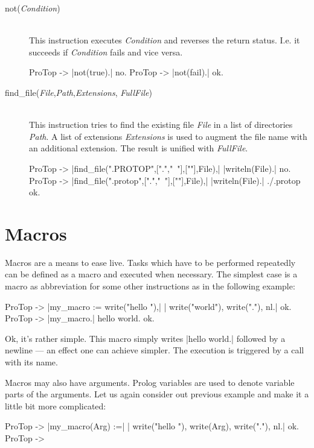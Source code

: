 \begin{description}
  \item [not({\em Condition}\/)]\ 
    \\
    This instruction executes {\em Condition}\/ and reverses the return
    status.  I.e. it succeeds if {\em Condition}\/ fails and vice versa.
\begin{BoxedSample}
  ProTop -> |not(true).|
  no.
  ProTop -> |not(fail).|
  ok.
\end{BoxedSample}

  \item [find\_file({\em File},{\em Path},{\em Extensions},{\em
      FullFile})]\ 
    \\
    This instruction tries to find the existing file {\em File} in a list of
    directories {\em Path}. A list of extensions {\em Extensions}\/ is used to
    augment the file name with an additional extension. The result is unified
    with {\em FullFile}.
\begin{BoxedSample}
  ProTop -> |find_file(".PROTOP",[".","~"],[""],File),|
            |writeln(File).|
  no.
  ProTop -> |find_file(".protop",[".","~"],[""],File),|
            |writeln(File).|
  ./.protop
  ok.
\end{BoxedSample}
  
  \end{description}

\section{Macros}

Macros are a means to ease live. Tasks which have to be performed repeatedly
can be defined as a macro and executed when necessary. The simplest case is
a macro as abbreviation for some other instructions as in the following
example:
\begin{BoxedSample}
  ProTop -> |my_macro := write("hello "),|
  |            write("world"), write("."), nl.|
  ok.
  ProTop -> |my_macro.|
  hello world.
  ok.
\end{BoxedSample}
Ok, it's rather simple. This macro simply writes |hello world.| followed by a
newline --- an effect one can achieve simpler. The execution is triggered by a
call with its name.

Macros may also have arguments. Prolog variables are used to denote variable
parts of the arguments. Let us again consider out previous example and make it
a little bit more complicated:
\begin{BoxedSample}
  ProTop -> |my_macro(Arg) :=|
  |           write("hello "), write(Arg), write("."), nl.|
  ok.
  ProTop ->
\end{BoxedSample}

